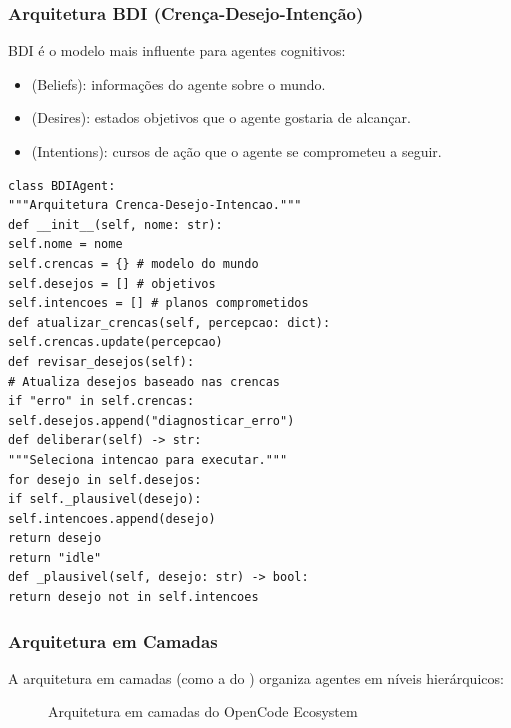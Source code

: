 \subsubsection*{Arquitetura BDI (Crença-Desejo-Intenção)}
BDI \cite{wooldridge2009multiagent} é o modelo mais influente para agentes
cognitivos:
\begin{itemize}
\item {} (Beliefs): informações do agente sobre o mundo.
\item {} (Desires): estados objetivos que o agente gostaria
de alcançar.
\item {} (Intentions): cursos de ação que o agente se
comprometeu a seguir.
\end{itemize}
\begin{lstlisting}[style=pythonstyle]
class BDIAgent:
"""Arquitetura Crenca-Desejo-Intencao."""
def __init__(self, nome: str):
self.nome = nome
self.crencas = {} # modelo do mundo
self.desejos = [] # objetivos
self.intencoes = [] # planos comprometidos
def atualizar_crencas(self, percepcao: dict):
self.crencas.update(percepcao)
def revisar_desejos(self):
# Atualiza desejos baseado nas crencas
if "erro" in self.crencas:
self.desejos.append("diagnosticar_erro")
def deliberar(self) -> str:
"""Seleciona intencao para executar."""
for desejo in self.desejos:
if self._plausivel(desejo):
self.intencoes.append(desejo)
return desejo
return "idle"
def _plausivel(self, desejo: str) -> bool:
return desejo not in self.intencoes
\end{lstlisting}
\subsubsection*{Arquitetura em Camadas}
A arquitetura em camadas (como a do \opencodeeco{}) organiza agentes em
níveis hierárquicos:
\begin{figure}[htb]
\centering
\caption{Arquitetura em camadas do OpenCode Ecosystem}
\label{fig:camadas-opencode}
\end{figure}
